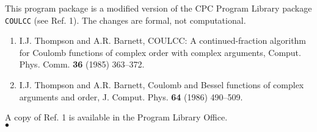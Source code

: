 \Source
This program package is a modified version of the CPC Program Library
package {\tt COULCC} (see Ref. 1). The changes are formal, not
computational.
\Refer
\begin{enumerate}
\item  I.J. Thompson and A.R. Barnett, COULCC: A
continued-fraction algorithm for Coulomb functions of complex order
with complex arguments, Comput. Phys. Comm. {\bf 36} (1985) 363--372.
\item I.J. Thompson and A.R. Barnett, Coulomb and Bessel functions of
complex arguments and order, J. Comput. Phys. {\bf 64} (1986) 490--509.
\end{enumerate}
\Longwr
A copy of Ref. 1 is available in the Program Library Office.
\\ $\bullet$
